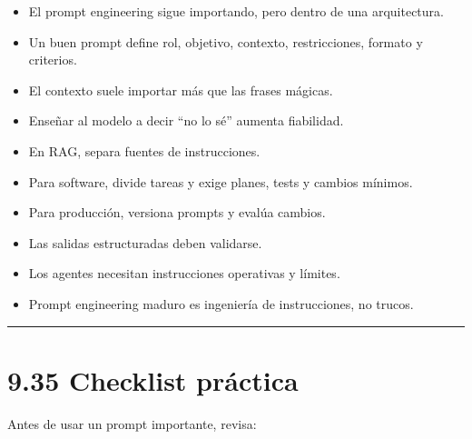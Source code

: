 \begin{itemize}
\tightlist
\item
  El prompt engineering sigue importando, pero dentro de una
  arquitectura.
\item
  Un buen prompt define rol, objetivo, contexto, restricciones, formato
  y criterios.
\item
  El contexto suele importar más que las frases mágicas.
\item
  Enseñar al modelo a decir ``no lo sé'' aumenta fiabilidad.
\item
  En RAG, separa fuentes de instrucciones.
\item
  Para software, divide tareas y exige planes, tests y cambios mínimos.
\item
  Para producción, versiona prompts y evalúa cambios.
\item
  Las salidas estructuradas deben validarse.
\item
  Los agentes necesitan instrucciones operativas y límites.
\item
  Prompt engineering maduro es ingeniería de instrucciones, no trucos.
\end{itemize}

\begin{center}\rule{0.5\linewidth}{0.5pt}\end{center}

\section{9.35 Checklist práctica}\label{checklist-pruxe1ctica-8}

Antes de usar un prompt importante, revisa:

